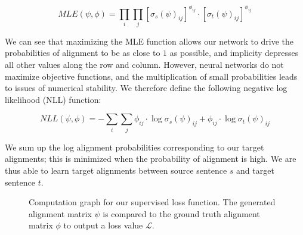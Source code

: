 \documentclass[twoside,twocolumn]{article}
\begin{document}
\begin{equation}
  MLE(\psi, \phi) = \prod_i \prod_j \left[ \sigma_s(\psi)_{ij} \right]^{\phi_{ij}} \cdot \left[ \sigma_t(\psi)_{ij} \right]^{\phi_{ij}}
\end{equation}

We can see that maximizing the MLE function allows our network to drive the
probabilities of alignment to be as close to $1$ as possible, and implicity
depresses all other values along the row and column. However, neural networks
do not maximize objective functions, and the multiplication of small
probabilities leads to issues of numerical stability. We therefore define the
following negative log likelihood (NLL) function:

\begin{equation}
  NLL(\psi, \phi) = - \sum_i \sum_j  \phi_{ij} \cdot \log \sigma_s (\psi)_{ij} + \phi_{ij} \cdot \log \sigma_t (\psi)_{ij}
\end{equation}

We sum up the log alignment probabilities corresponding to our target
alignments; this is minimized when the probability of alignment is high. We
are thus able to learn target alignments between source sentence $s$ and target
sentence $t$.

\begin{figure}
  \centering
  \caption{Computation graph for our supervised loss function.
    The generated alignment matrix $\psi$ is compared to the ground
    truth alignment matrix $\phi$ to output a loss value $\mathcal{L}$.}
  \label{fig:supervised_loss}
\end{figure}
\end{document}
